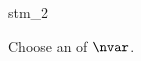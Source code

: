 \documentclass{stex}
\begin{document}
\begin{smodule}{stm_2}
  
  \begin{sassertion}[id=stm-2]
    Choose an   of $\nvar$.
  \end{sassertion}
\end{smodule}
\end{document}
